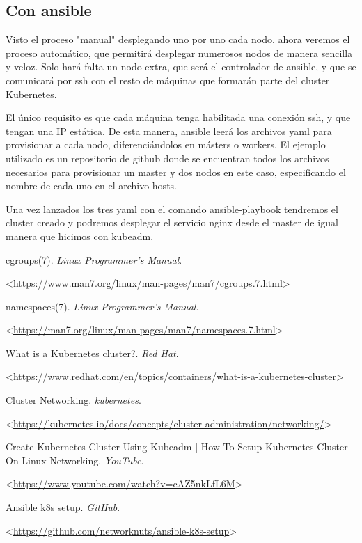 \documentclass[]{article}
\begin{document}
\subsection{Con ansible}

Visto el proceso "manual" desplegando uno por uno cada nodo, ahora veremos el proceso automático, que permitirá desplegar numerosos nodos de manera sencilla y veloz. Solo hará falta un nodo extra, que será el controlador de ansible, y que se comunicará por ssh con el resto de máquinas que formarán parte del cluster Kubernetes. 

El único requisito es que cada máquina tenga habilitada una conexión ssh, y que tengan una IP estática. De esta manera, ansible leerá los archivos yaml para provisionar a cada nodo, diferenciándolos en másters o workers. El ejemplo utilizado \cite{github_ansible} es un repositorio de github donde se encuentran todos los archivos necesarios para provisionar un master y dos nodos en este caso, especificando el nombre de cada uno en el archivo hosts.

Una vez lanzados los tres yaml con el comando ansible-playbook tendremos el cluster creado y podremos desplegar el servicio nginx desde el master de igual manera que hicimos con kubeadm.

\begin{thebibliography}{10}
cgroups(7). \textit{Linux Programmer's Manual}.

<\url{https://www.man7.org/linux/man-pages/man7/cgroups.7.html}> 

namespaces(7). \textit{Linux Programmer's Manual}.

<\url{https://man7.org/linux/man-pages/man7/namespaces.7.html}> 

What is a Kubernetes cluster?. \textit{Red Hat}.

<\url{https://www.redhat.com/en/topics/containers/what-is-a-kubernetes-cluster}> 

Cluster Networking. \textit{kubernetes}.

<\url{https://kubernetes.io/docs/concepts/cluster-administration/networking/}> 

Create Kubernetes Cluster Using Kubeadm | How To Setup Kubernetes Cluster On Linux Networking. \textit{YouTube}.

<\url{https://www.youtube.com/watch?v=cAZ5nkLfL6M}> 

Ansible k8s setup. \textit{GitHub}.

<\url{https://github.com/networknuts/ansible-k8s-setup}> 
\end{thebibliography}
\end{document}
